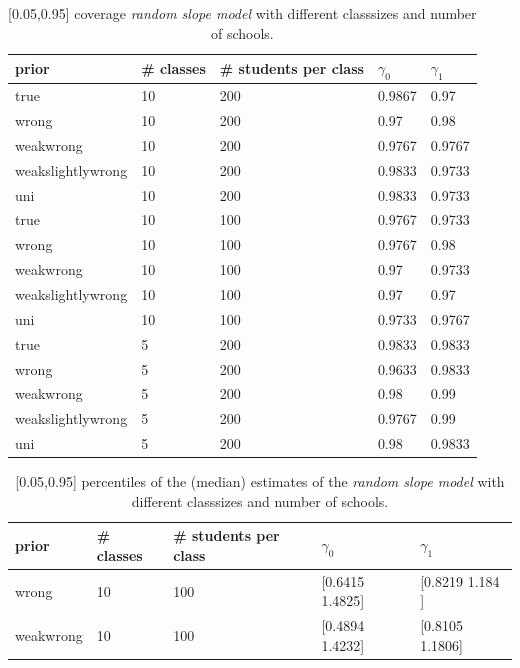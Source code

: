 \begin{table}[!ht]
\begin{center}
\begin{tabular}{l l l l  l}
prior & \# classes & \#  students per class &  $\gamma_0$ & $ \gamma_1$ \\
\hline
\hline
true & 10  &  200  &  0.9867  &  0.97\\
wrong & 10  &  200  &  0.97  &  0.98\\
weakwrong & 10  &  200  &  0.9767  &  0.9767\\
weakslightlywrong & 10  &  200  &  0.9833  &  0.9733\\
uni & 10  &  200  &  0.9833  &  0.9733\\
\hline
true &10  &  100  &  0.9767  &  0.9733\\
wrong & 10  &  100  &  0.9767  &  0.98\\
weakwrong & 10  &  100  &  0.97  &  0.9733 \\
weakslightlywrong &10  &  100  &  0.97  &  0.97\\
uni &10  &  100  &  0.9733  &  0.9767\\ 
\hline
true & 5  &  200  &  0.9833  &  0.9833\\
wrong & 5  &  200  &  0.9633  &  0.9833\\
weakwrong & 5  &  200  &  0.98  &  0.99\\
weakslightlywrong &5  &  200  &  0.9767  &  0.99\\
uni &5  &  200  &  0.98  &  0.9833\\
\end{tabular}
\end{center}
\caption{[0.05,0.95] coverage \emph{random slope model}  with different classsizes and number of schools. }
\label{tab:coverage}
\end{table}


\begin{table}[!ht]
\begin{center}
\begin{tabular}{l l l l  l}
prior & \# classes & \#  students per class &  $\gamma_0$ & $ \gamma_1$ \\
\hline
wrong &10  &  100  &  [0.6415 1.4825]  &  [0.8219 1.184 ]\\
weakwrong & 10  &  100  &  [0.4894 1.4232]  &  [0.8105 1.1806]\\
\hline
\end{tabular}
\end{center}
\caption{ [0.05,0.95] percentiles of the (median) estimates of the  \emph{random slope model}  with different classsizes and number of schools. }
\label{tab:median}
\end{table}